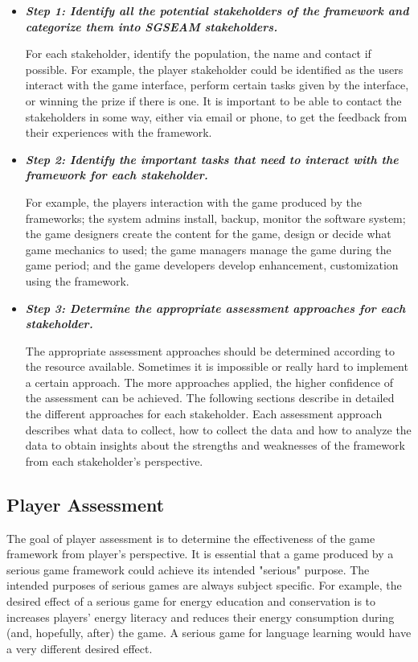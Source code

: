 \documentclass[11pt]{article}
\begin{document}
\begin{itemize}
\item \textbf{\emph{Step 1: Identify all the potential stakeholders of the framework and categorize them into SGSEAM stakeholders.}}

For each stakeholder, identify the population, the name and contact if possible. For example, the 
player stakeholder could be identified as the users interact with the game interface, perform certain tasks given by the interface, or winning the prize if there is one. It is important to be able to contact the stakeholders in some way, either via email or phone, to get the feedback from their experiences with the framework.


\item \textbf{\emph{Step 2: Identify the important tasks that need to interact with the framework for each stakeholder.}}
    
For example, the players interaction with the game produced by the frameworks; the system admins install, backup, monitor the software system; the game designers create the content for the game, design or decide what game mechanics to used; the game managers manage the game during the game period; and the game developers develop enhancement, customization using the framework.

\item \textbf{\emph{Step 3: Determine the appropriate assessment approaches for each stakeholder.}}

The appropriate assessment approaches should be determined according to the resource available. Sometimes it is impossible or really hard to implement a certain approach. The more approaches applied, the higher confidence of the assessment can be achieved. The following sections describe in detailed the different approaches for each stakeholder.  Each assessment approach describes what data to collect, how to collect the data and how to analyze the data to obtain insights about the strengths and weaknesses of the framework from each stakeholder's perspective.

\end{itemize}

\subsection{Player Assessment}

The goal of player assessment is to determine the effectiveness of the game
framework from player's perspective. It is essential that a game produced by a serious game
framework could achieve its intended "serious" purpose. The intended purposes of serious games are
always subject specific. For example, the desired effect of a serious game for
energy education and conservation is to increases players' energy literacy and
reduces their energy consumption during (and, hopefully, after) the game. A serious game for
language learning would have a very different desired effect.
\end{document}
